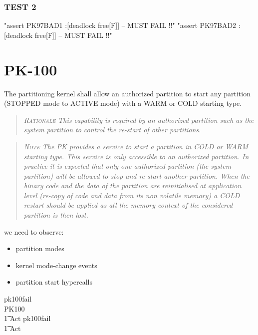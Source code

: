 \subsubsection{TEST 2}
\begin{assert}
"assert PK97BAD1 :[deadlock free[F]]  -- MUST FAIL !!"
\also "assert PK97BAD2 :[deadlock free[F]]  -- MUST FAIL !!"
\end{assert}


\section{PK-100}

The partitioning kernel shall allow an authorized partition
to start any partition (STOPPED mode to ACTIVE mode)
with a WARM or COLD starting type.
\begin{quote}\it
\textsc{Rationale}
 This capability is required by an authorized partition
 such as the system partition to control the re-start of other partitions.
\end{quote}
\begin{quote}\it
\textsc{Note}
The PK provides a service to start a partition in COLD or WARM starting type.
This service is only accessible to an authorized partition.
In practice it is expected that only one authorized partition
(the system partition) will be allowed to stop and re-start another partition.
When the binary code and the data of the partition are reinitialised
at application level (re-copy of code and data from its non volatile memory)
a COLD restart should be applied
as all the memory context of the considered partition is then lost.
\end{quote}


 we need to observe:
 \begin{itemize}
 \item partition modes
 \item kernel mode-change events
 \item partition start hypercalls
\end{itemize}
\begin{circus}
\circchannel pk100fail\\

\circprocess PK100 \circdef \circbegin
\\ \t1 Act \circdef pk100fail \then \Stop
\\ \t1 \circspot Act
\\ \circend
\end{circus}

